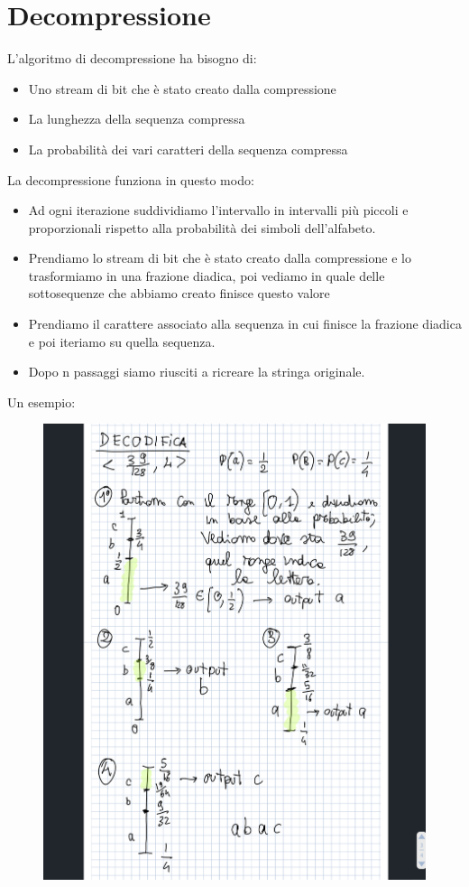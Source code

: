 \documentclass[14pt]{extreport}
\begin{document}
\section{Decompressione}

L'algoritmo di decompressione ha bisogno di:
\begin{itemize}
\item Uno stream di bit che è stato creato dalla compressione
\item La lunghezza della sequenza compressa
\item La probabilità dei vari caratteri della sequenza compressa
\end{itemize}

La decompressione funziona in questo modo:
\begin{itemize}
\item Ad ogni iterazione suddividiamo l'intervallo in intervalli più piccoli e proporzionali rispetto alla probabilità dei simboli dell'alfabeto.
\item Prendiamo lo stream di bit che è stato creato dalla compressione e lo trasformiamo in una frazione diadica, poi vediamo in quale delle sottosequenze che abbiamo creato finisce questo valore
\item Prendiamo il carattere associato alla sequenza in cui finisce la frazione diadica e poi iteriamo su quella sequenza.
\item Dopo n passaggi siamo riusciti a ricreare la stringa originale.
\end{itemize}

Un esempio:

\begin{figure}[H]
\centering
  \includegraphics[width=\linewidth]{IMG_0177.jpg}
\end{figure}
\end{document}
